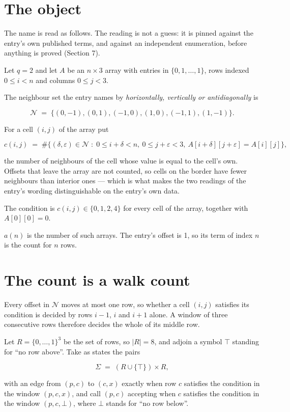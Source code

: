 \documentclass[11pt]{article}
\theoremstyle{definition}
\begin{document}
\section{The object}

The name is read as follows. The reading is not a guess: it is pinned against the entry's own published terms, and against an independent enumeration, before anything is proved (Section 7).

Let $q = 2$ and let $A$ be an $n \times 3$ array with entries in $\{0,1,\dots,1\}$, rows indexed $0 \le i < n$ and columns $0 \le j < 3$.

The neighbour set the entry names by {\itshape horizontally, vertically or antidiagonally} is

\[\mathcal{N} \;=\; \{(0,-1), (0,1), (-1,0), (1,0), (-1,1), (1,-1)\}.\]

For a cell $(i,j)$ of the array put

\[c(i,j) \;=\; \#\bigl\{(\delta,\varepsilon)\in\mathcal{N} \;:\; 0\le i+\delta<n,\ 0\le j+\varepsilon<3,\ A[i+\delta][j+\varepsilon] = A[i][j]\bigr\},\]

the number of neighbours of the cell whose value is equal to the cell's own. Offsets that leave the array are not counted, so cells on the border have fewer neighbours than interior ones --- which is what makes the two readings of the entry's wording distinguishable on the entry's own data.

The condition is $c(i,j) \in \{0, 1, 2, 4\}$ for every cell of the array, together with $A[0][0]=0$.

$a(n)$ is the number of such arrays. The entry's offset is 1, so its term of index $n$ is the count for $n$ rows.

\section{The count is a walk count}

Every offset in $\mathcal{N}$ moves at most one row, so whether a cell $(i,j)$ satisfies its condition is decided by rows $i-1$, $i$ and $i+1$ alone. A window of three consecutive rows therefore decides the whole of its middle row.

Let $R = \{0,\dots,1\}^{3}$ be the set of rows, so $|R| = 8$, and adjoin a symbol $\top$ standing for ``no row above''. Take as states the pairs

\[\Sigma \;=\; (R \cup \{\top\}) \times R,\]

with an edge from $(p,c)$ to $(c,x)$ exactly when row $c$ satisfies the condition in the window $(p,c,x)$, and call $(p,c)$ accepting when $c$ satisfies the condition in the window $(p,c,\bot)$, where $\bot$ stands for ``no row below''.
\end{document}
